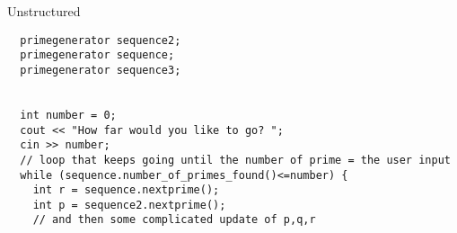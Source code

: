Unstructured

\begin{lstlisting}
  primegenerator sequence2;  
  primegenerator sequence; 
  primegenerator sequence3;  
  

  int number = 0; 
  cout << "How far would you like to go? "; 
  cin >> number;
  // loop that keeps going until the number of prime = the user input    
  while (sequence.number_of_primes_found()<=number) {  
    int r = sequence.nextprime(); 
    int p = sequence2.nextprime();
    // and then some complicated update of p,q,r
\end{lstlisting}

